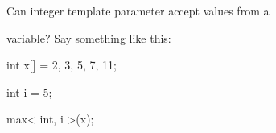 Can integer template parameter accept values from a

variable? Say something like this:



\begin{consolethree}[escapeinside=||]

int x[] = {2, 3, 5, 7, 11};

int i = 5;

max< int, i >(x);

\end{consolethree}

